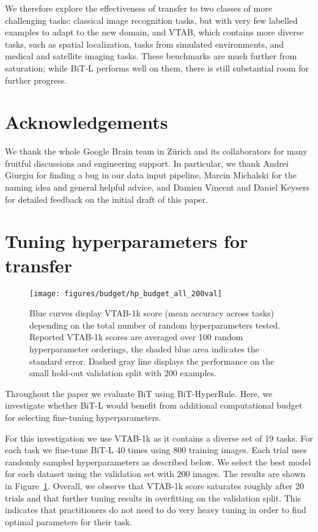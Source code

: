 \documentclass[runningheads]{llncs}
\newcommand{\name}{{BiT}}
\newcommand{\hyper}{{BiT-HyperRule}}
\begin{document}
We therefore explore the effectiveness of transfer to two classes of more challenging tasks:
classical image recognition tasks, but with very few labelled examples to adapt to the new domain, and VTAB, which contains more diverse tasks, such as spatial localization, tasks from simulated environments, and medical and satellite imaging tasks.
These benchmarks are much further from saturation; while \name{}-L performs well on them, there is still substantial room for further progress.

\section{Acknowledgements}

We thank the whole Google Brain team in Z\"urich and its collaborators for many fruitful discussions and engineering support.
In particular, we thank Andrei Giurgiu for finding a bug in our data input pipeline, Marcin Michalski for the naming idea and general helpful advice, and Damien Vincent and Daniel Keysers for detailed feedback on the initial draft of this paper.
 




\clearpage

\appendix

\section{Tuning hyperparameters for transfer}\label{sec:tuningtransfer}

\begin{figure}[t]
\begin{center}
   \texttt{[image: figures/budget/hp\_budget\_all\_200val]}
\end{center}
\caption{Blue curves display VTAB-1k score (mean accuracy across tasks) depending on the total number of random hyperparameters tested. Reported VTAB-1k scores are averaged over 100 random hyperparameter orderings, the shaded blue area indicates the standard error. Dashed gray line displays the performance on the small hold-out validation split with 200 examples.}
\label{fig:budget}
\end{figure}

Throughout the paper we evaluate \name{} using \hyper{}.
Here, we investigate whether \name{}-L would benefit from additional computational budget for selecting fine-tuning hyperparameters.

For this investigation we use VTAB-1k as it contains a diverse set of 19 tasks.
For each task we fine-tune \name{}-L 40 times using 800 training images.
Each trial uses randomly sampled hyperparameters as described below.
We select the best model for each dataset using the validation set with 200 images.
The results are shown in Figure~\ref{fig:budget}.
Overall, we observe that VTAB-1k score saturates roughly after 20 trials and that further tuning results in overfitting on the validation split.
This indicates that practitioners do not need to do very heavy tuning in order to find optimal parameters for their task.
\end{document}

